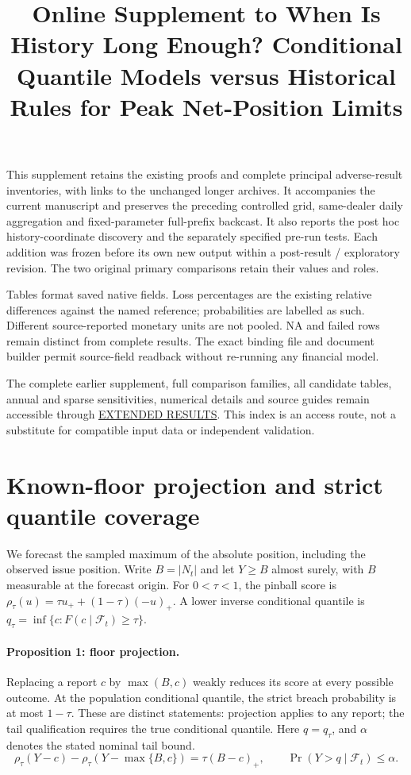 \documentclass[11pt,a4paper]{article}
\title{Online Supplement to When Is History Long Enough? Conditional Quantile Models versus Historical Rules for Peak Net-Position Limits}
\author{}
\date{}
\begin{document}
\maketitle
This supplement retains the existing proofs and complete principal adverse-result
inventories, with links to the unchanged longer archives. It accompanies the
current manuscript and preserves the preceding controlled grid, same-dealer daily
aggregation and fixed-parameter full-prefix backcast. It also reports the post hoc
history-coordinate discovery and the separately specified pre-run tests. Each addition was frozen
before its own new output within a post-result / exploratory revision. The
two original primary comparisons retain their values and roles.

Tables format saved native fields. Loss percentages are the existing relative
differences against the named reference; probabilities are labelled as such.
Different source-reported monetary units are not pooled. NA and failed rows
remain distinct from complete results. The exact binding file and document
builder permit source-field readback without re-running any financial model.

The complete earlier supplement, full comparison families, all candidate
tables, annual and sparse sensitivities, numerical details and source guides
remain accessible through \href{https://github.com/ByronLi0207/financial-mathematics-paper-20261020/blob/revision-v7-final/EXTENDED_RESULTS.md}{EXTENDED RESULTS}.
This index is an access route, not a substitute for compatible input data or
independent validation.
\section{Known-floor projection and strict quantile coverage}\label{sup:floor}

We forecast the sampled maximum of the absolute position, including
the observed issue position. Write \(B=|N_t|\) and let \(Y\ge B\) almost surely,
with \(B\) measurable at the forecast origin. For \(0<\tau<1\), the pinball score is
\(\rho_\tau(u)=\tau u_+ +(1-\tau)(-u)_+\). A lower inverse conditional quantile
is \(q_\tau=\inf\{c:F(c\mid\mathcal F_t)\ge\tau\}\).

\paragraph{Proposition 1: floor projection.}
Replacing a report \(c\) by \(\max(B,c)\) weakly reduces its score at every possible
outcome. At the population conditional quantile, the strict breach probability
is at most \(1-\tau\). These are distinct statements: projection applies to any
report; the tail qualification requires the true conditional quantile.
Here \(q=q_\tau\), and \(\alpha\) denotes the stated nominal tail bound.
\[
\rho_\tau(Y-c)-\rho_\tau(Y-\max\{B,c\})=\tau(B-c)_+,\qquad \Pr(Y>q\mid\mathcal F_t)\le\alpha.
\]
\end{document}
